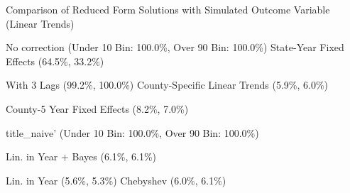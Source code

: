 \caption{Comparison of Reduced Form Solutions with Simulated Outcome Variable (Linear Trends) \label{fig:distributions-existing-solutions}}
\caption*{\color{p1line}{\textbf{\textemdash\textemdash}} No correction (Under 10 Bin: 100.0\%, Over 90 Bin: 100.0\%) \hspace{1cm} \color{p2line}{- - -} State-Year Fixed Effects (64.5\%, 33.2\%)}
\caption*{\color{p3line}{\textbf{- - -}} With 3 Lags (99.2\%, 100.0\%) \hspace{1cm} \color{p4line}{\textbf{- - -}} County-Specific Linear Trends (5.9\%, 6.0\%)}
\caption*{\color{p5line}{\textbf{- - -}} County-5 Year Fixed Effects (8.2\%, 7.0\%)}


\caption*{\color{p1line}{\textbf{\textemdash\textemdash}} title_naive' (Under 10 Bin: 100.0\%, Over 90 Bin: 100.0\%)}
\caption*{\color{p2line}{\textbf{- - -}} Lin. in Year + Bayes (6.1\%, 6.1\%)}
\caption*{\color{p3line}{\textbf{- - -}} Lin. in Year (5.6\%, 5.3\%) \hspace{1cm} \color{p4line}{\textbf{- - -}} Chebyshev (6.0\%, 6.1\%)}